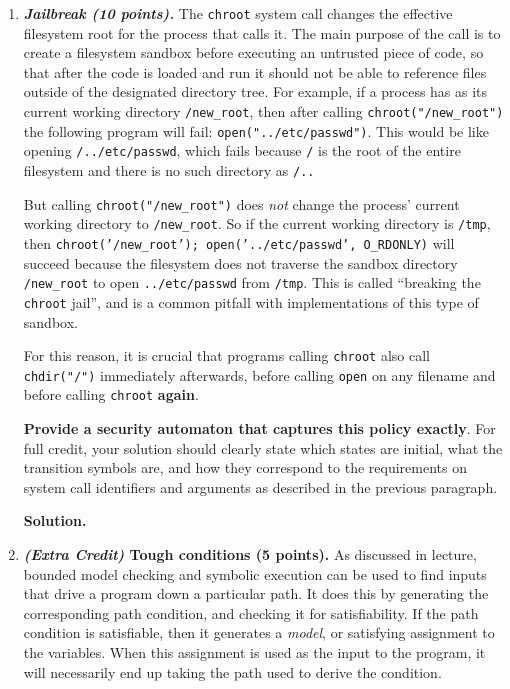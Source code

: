 \documentclass[10pt]{article}
\begin{document}
\begin{enumerate}


\newpage

\item \textbf{\textit{Jailbreak (10 points).}} The \texttt{chroot} system call changes the effective filesystem root for the process that calls it. The main purpose of the call is to create a filesystem sandbox before executing an untrusted piece of code, so that after the code is loaded and run it should not be able to reference files outside of the designated directory tree. For example, if a process has as its current working directory \verb'/new_root', then after calling \verb'chroot("/new_root")' the following program will fail: \verb'open("../etc/passwd")'. This would be like opening \verb'/../etc/passwd', which fails because \verb'/' is the root of the entire filesystem and there is no such directory as \verb'/..'

But calling \verb'chroot("/new_root")' does \emph{not} change the process' current working directory to \verb'/new_root'. So if the current working directory is \verb'/tmp', then \texttt{chroot('/new\_root'); open('../etc/passwd', O\_RDONLY)} will succeed because the filesystem does not traverse the sandbox directory \verb'/new_root' to open \verb'../etc/passwd' from \verb'/tmp'. This is called ``breaking the \texttt{chroot} jail'', and is a common pitfall with implementations of this type of sandbox.

For this reason, it is crucial that programs calling \texttt{chroot} also call \verb'chdir("/")' immediately afterwards, before calling \verb'open' on any filename and before calling \verb'chroot' \textbf{again}. 

\textbf{Provide a security automaton that captures this policy exactly}. For full credit, your solution should clearly state which states are initial, what the transition symbols are, and how they correspond to the requirements on system call identifiers and arguments as described in the previous paragraph.

\textbf{Solution.}



\newpage

\item \textbf{\textit{(Extra Credit)} Tough conditions (5 points).} As discussed in lecture, bounded model checking and symbolic execution can be used to find inputs that drive a program down a particular path. It does this by generating the corresponding path condition, and checking it for satisfiability. If the path condition is satisfiable, then it generates a \emph{model}, or satisfying assignment to the variables. When this assignment is used as the input to the program, it will necessarily end up taking the path used to derive the condition.


\end{enumerate}
\end{document}
